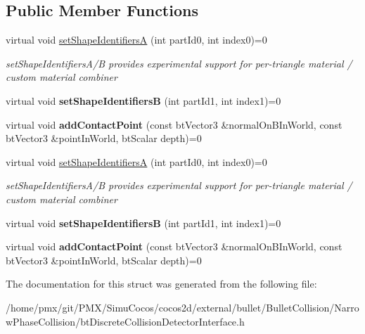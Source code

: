 \subsection*{Public Member Functions}
\begin{DoxyCompactItemize}
\item 
\mbox{\label{structbtDiscreteCollisionDetectorInterface_1_1Result_a09a94d4714f153a138cd3a9c12b33588}} 
virtual void \hyperlink{structbtDiscreteCollisionDetectorInterface_1_1Result_a09a94d4714f153a138cd3a9c12b33588}{set\+Shape\+IdentifiersA} (int part\+Id0, int index0)=0
\begin{DoxyCompactList}\small\item\em set\+Shape\+Identifiers\+A/B provides experimental support for per-\/triangle material / custom material combiner \end{DoxyCompactList}\item 
\mbox{\label{structbtDiscreteCollisionDetectorInterface_1_1Result_a13bc80575335dd02ab74fc873cb274b4}} 
virtual void {\bfseries set\+Shape\+IdentifiersB} (int part\+Id1, int index1)=0
\item 
\mbox{\label{structbtDiscreteCollisionDetectorInterface_1_1Result_a7097b0d4919b1655f63e7b7dea2879d9}} 
virtual void {\bfseries add\+Contact\+Point} (const bt\+Vector3 \&normal\+On\+B\+In\+World, const bt\+Vector3 \&point\+In\+World, bt\+Scalar depth)=0
\item 
\mbox{\label{structbtDiscreteCollisionDetectorInterface_1_1Result_a09a94d4714f153a138cd3a9c12b33588}} 
virtual void \hyperlink{structbtDiscreteCollisionDetectorInterface_1_1Result_a09a94d4714f153a138cd3a9c12b33588}{set\+Shape\+IdentifiersA} (int part\+Id0, int index0)=0
\begin{DoxyCompactList}\small\item\em set\+Shape\+Identifiers\+A/B provides experimental support for per-\/triangle material / custom material combiner \end{DoxyCompactList}\item 
\mbox{\label{structbtDiscreteCollisionDetectorInterface_1_1Result_a13bc80575335dd02ab74fc873cb274b4}} 
virtual void {\bfseries set\+Shape\+IdentifiersB} (int part\+Id1, int index1)=0
\item 
\mbox{\label{structbtDiscreteCollisionDetectorInterface_1_1Result_a7097b0d4919b1655f63e7b7dea2879d9}} 
virtual void {\bfseries add\+Contact\+Point} (const bt\+Vector3 \&normal\+On\+B\+In\+World, const bt\+Vector3 \&point\+In\+World, bt\+Scalar depth)=0
\end{DoxyCompactItemize}


The documentation for this struct was generated from the following file\+:\begin{DoxyCompactItemize}
\item 
/home/pmx/git/\+P\+M\+X/\+Simu\+Cocos/cocos2d/external/bullet/\+Bullet\+Collision/\+Narrow\+Phase\+Collision/bt\+Discrete\+Collision\+Detector\+Interface.\+h\end{DoxyCompactItemize}
